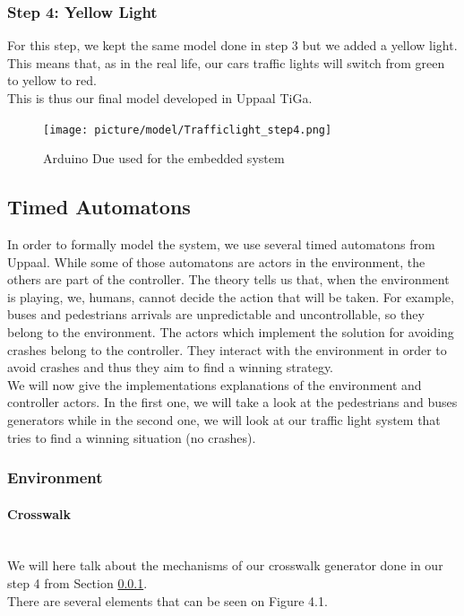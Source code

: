 \subsubsection{Step 4: Yellow Light}\label{sec:step4}
For this step, we kept the same model done in step 3 but we added a yellow light. This means that, as in the real life, our cars traffic lights will switch from green to yellow to red. \\
This is thus our final model developed in Uppaal TiGa.

\begin{figure}[!ht]\label{fig:arduino}
  \centering
    \texttt{[image: picture/model/Trafficlight\_step4.png]}
    \caption{Arduino Due used for the embedded system}
\end{figure}

\subsection{Timed Automatons}
In order to formally model the system, we use several timed automatons from Uppaal. While some of those automatons are actors in the environment, the others are part of the controller.
The theory tells us that, when the environment is playing, we, humans, cannot decide the action that will be taken. For example, buses and pedestrians arrivals are unpredictable and uncontrollable, so they belong to the environment.
The actors which implement the solution for avoiding crashes belong to the controller. They interact with the environment in order to avoid crashes and thus they aim to find a winning strategy. \\
We will now give the implementations explanations of the environment and controller actors. In the first one, we will take a look at the pedestrians and buses generators while in the second one, we will look at our traffic light system that tries to find a winning situation (no crashes).

\subsubsection{Environment}
\paragraph{Crosswalk} \mbox{}\\
We will here talk about the mechanisms of our crosswalk generator done in our step 4 from Section \ref{sec:step4}. \\
There are several elements that can be seen on Figure 4.1.

